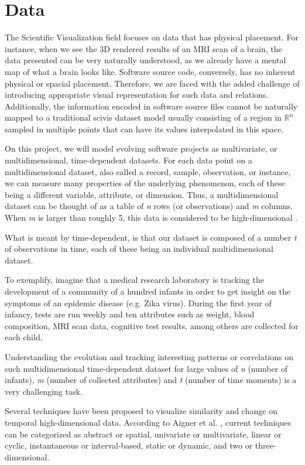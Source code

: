 \section{Data}
The Scientific Visualization field focuses on data that has physical placement. For instance, when we see the 3D rendered results of an MRI scan of a brain, the data presented can be very naturally understood, as we already have a mental map of what a brain looks like. Software source code, conversely, has no inherent physical or spacial placement. Therefore, we are faced with the added challenge of introducing appropriate visual representation for such data and relations. Additionally, the information encoded in software source files cannot be naturally mapped to a traditional scivis dataset model usually consisting of a region in $\mathbb{R}^{n}$ sampled in multiple points that can have its values interpolated in this space.

On this project, we will model evolving software projects as multivariate, or multidimensional, time-dependent datasets. For each data point on a multidimensional dataset, also called a record, sample, observation, or instance, we can measure many properties of the underlying phenomenon, each of these being a different variable, attribute, or dimension. Thus, a multidimensional dataset can be thought of as a table of \textit{n} rows (or observations) and \textit{m} columns. When \textit{m} is larger than roughly 5, this data is considered to be high-dimensional .

What is meant by time-dependent, is that our dataset is composed of a number \textit{t} of observations in time, each of these being an individual multidimensional dataset.

To exemplify, imagine that a medical research laboratory is tracking the development of a community of a hundred infants in order to get insight on the symptoms of an epidemic disease (e.g. Zika virus). During the first year of infancy, tests are run weekly and ten attributes such as weight, blood composition, MRI scan data, cognitive test results, among others are collected for each child.

Understanding the evolution and tracking interesting patterns or correlations on such multidimensional time-dependent dataset for large values of \textit{n} (number of infants), \textit{m} (number of collected attributes) and \textit{t} (number of time moments) is a very challenging task.

Several techniques have been proposed to visualize similarity and change on temporal high-dimensional data. According to Aigner et al. \cite{ref:timedata}, current techniques can be categorized as abstract or spatial, univariate or multivariate, linear or cyclic, instantaneous or interval-based, static or dynamic, and two or three-dimensional.

